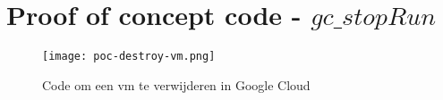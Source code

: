 \section{Proof of concept code - \(gc\_stopRun\)}\label{appendix:poc-destroy-vm}
\begin{figure}[hbt!]
  \centering
  \texttt{[image: poc-destroy-vm.png]}
  \caption{Code om een \acrfull{vm} te verwijderen in Google Cloud}
  \label{fig:poc-destroy-vm}
\end{figure}

\newpage